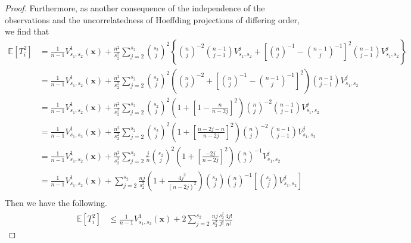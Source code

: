 \documentclass[letterpaper,10pt]{article}
\numberwithin{equation}{section}
\numberwithin{thm}{section}
\numberwithin{lem}{section}
\numberwithin{cor}{section}
\newcommand{\E}{\mathbb{E}}
\newcommand{\1}{\mathbbm{1}}
\begin{document}
\begin{proof}
	Furthermore, as another consequence of the independence of the observations and the uncorrelatedness of Hoeffding projections of differing order, we find that
	\begin{equation}
		\begin{aligned}
			\E\left[T_{i}^{2}\right]
			 & = \frac{1}{n-1} V_{s_1, s_2}^{1}\left(\mathbf{x}\right)
			+ \frac{n^2}{s_2^2}\sum_{j = 2}^{s_2}\binom{s_2}{j}^2\left\{
			\binom{n}{j}^{-2}\binom{n-1}{j-1}V_{s_1, s_2}^{j}
			+ \left[\binom{n}{j}^{-1} - \binom{n-1}{j}^{-1}\right]^2 \binom{n-1}{j-1}V_{s_1, s_2}^{j}
			\right\}                                                                                                                         \\
			 & = \frac{1}{n-1} V_{s_1, s_2}^{1}\left(\mathbf{x}\right)
			+ \frac{n^2}{s_2^2}\sum_{j = 2}^{s_2}\binom{s_2}{j}^2
			\left(\binom{n}{j}^{-2} + \left[\binom{n}{j}^{-1} - \binom{n-1}{j}^{-1}\right]^2\right) \binom{n-1}{j-1}V_{s_1, s_2}^{j}         \\
			 & = \frac{1}{n-1} V_{s_1, s_2}^{1}\left(\mathbf{x}\right)
			+ \frac{n^2}{s_2^2}\sum_{j = 2}^{s_2}\binom{s_2}{j}^2
			\left(1 + \left[1 - \frac{n}{n - 2j}\right]^2\right)\binom{n}{j}^{-2} \binom{n-1}{j-1}V_{s_1, s_2}^{j}                           \\
			 & = \frac{1}{n-1} V_{s_1, s_2}^{1}\left(\mathbf{x}\right)
			+ \frac{n^2}{s_2^2}\sum_{j = 2}^{s_2}\binom{s_2}{j}^2
			\left(1 + \left[\frac{n-2j - n}{n - 2j}\right]^2\right)\binom{n}{j}^{-2} \binom{n-1}{j-1}V_{s_1, s_2}^{j}                        \\
			 & = \frac{1}{n-1} V_{s_1, s_2}^{1}\left(\mathbf{x}\right)
			+ \frac{n^2}{s_2^2}\sum_{j = 2}^{s_2} \frac{j}{n} \binom{s_2}{j}^2
			\left(1 + \left[\frac{-2j}{n - 2j}\right]^2\right)\binom{n}{j}^{-1} V_{s_1, s_2}^{j}                                             \\
			 & = \frac{1}{n-1} V_{s_1, s_2}^{1}\left(\mathbf{x}\right)
			+ \sum_{j = 2}^{s_2} \frac{n j}{s_2^2}
			\left(1 + \frac{4 j^2}{\left(n - 2j\right)^2}\right)\binom{s_2}{j} \binom{n}{j}^{-1} \left[\binom{s_2}{j}V_{s_1, s_2}^{j}\right] \\
		\end{aligned}
	\end{equation}
	Then we have the following.
	\begin{equation}
		\begin{aligned}
			\E\left[T_{i}^{2}\right]
			 & \leq \frac{1}{n-1} V_{s_1, s_2}^{1}\left(\mathbf{x}\right)
			+ 2 \sum_{j = 2}^{s_2} \frac{n j}{s_2^2}\frac{s_2^j}{j!}\frac{4 j!}{n^{j}}

\end{aligned}
\end{equation}
\end{proof}
\end{document}
